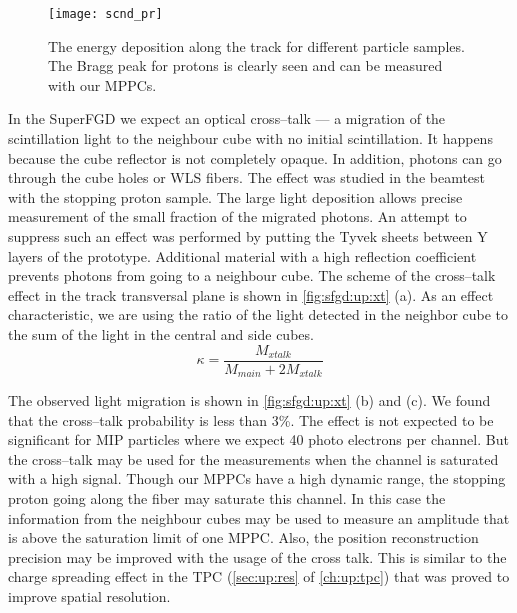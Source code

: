 \documentclass[main.tex]{subfiles}
\begin{document}
\begin{figure}[!ht]
	\centering
	\texttt{[image: scnd\_pr]}
	\caption{The energy deposition along the track for different particle samples. The Bragg peak for protons is clearly seen and can be measured with our MPPCs.}
	\label{fig:up:sfgd:scnd_pr}
\end{figure}

In the SuperFGD we expect an optical cross--talk --- a migration of the scintillation light to the neighbour cube with no initial scintillation. It happens because the cube reflector is not completely opaque. In addition, photons can go through the cube holes or WLS fibers. The effect was studied in the beamtest with the stopping proton sample. The large light deposition allows precise measurement of the small fraction of the migrated photons. An attempt to suppress such an effect was performed by putting the Tyvek sheets between Y layers of the prototype. Additional material with a high reflection coefficient prevents photons from going to a neighbour cube. The scheme of the cross--talk effect in the track transversal plane is shown in \autoref{fig:sfgd:up:xt} (a). As an effect characteristic, we are using the ratio of the light detected in the neighbor cube to the sum of the light in the central and side cubes.
\begin{equation}
\label{eq:xt}
\kappa=\frac{M_{xtalk}}{M_{main}+2M_{xtalk}}
\end{equation}

The observed light migration is shown in \autoref{fig:sfgd:up:xt} (b) and (c). We found that the cross--talk probability is less than 3\%. The effect is not expected to be significant for MIP particles where we expect 40 photo electrons per channel. But the cross--talk may be used for the measurements when the channel is saturated with a high signal. Though our MPPCs have a high dynamic range, the stopping proton going along the fiber may saturate this channel. In this case the information from the neighbour cubes may be used to measure an amplitude that is above the saturation limit of one MPPC. Also, the position reconstruction precision may be improved with the usage of the cross talk. This is similar to the charge spreading effect in the TPC (\autoref{sec:up:res} of \autoref{ch:up:tpc}) that was proved to improve spatial resolution. 
\end{document}
